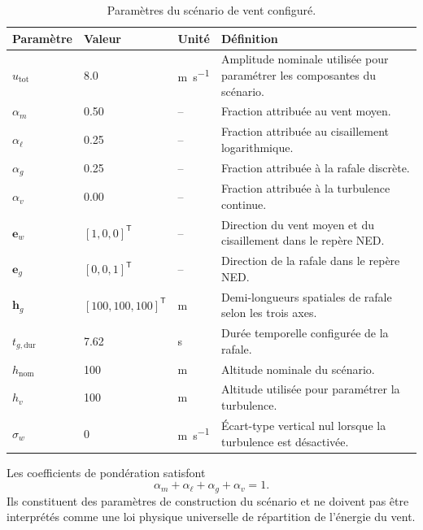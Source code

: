 \documentclass[11pt,a4paper,oneside]{report}
\newcommand{\vect}[1]{\bm{#1}}
\newcommand{\trans}{^{\mathsf T}}
\begin{document}
	\begin{table}[H]
		\centering
		\caption{Paramètres du scénario de vent configuré.}
		\label{tab_wind_scenario}
		\begin{tabularx}{\textwidth}{@{}L{4.7cm}L{3.2cm}L{2.3cm}Y@{}}
			\toprule
			\textbf{Paramètre} &
			\textbf{Valeur} &
			\textbf{Unité} &
			\textbf{Définition}\\
			\midrule
			$u_{\mathrm{tot}}$ &
			\num{8.0} &
			\si{m.s^{-1}} &
			Amplitude nominale utilisée pour paramétrer les composantes du scénario.\\
			$\alpha_m$ &
			\num{0.50} &
			-- &
			Fraction attribuée au vent moyen.\\
			$\alpha_{\ell}$ &
			\num{0.25} &
			-- &
			Fraction attribuée au cisaillement logarithmique.\\
			$\alpha_g$ &
			\num{0.25} &
			-- &
			Fraction attribuée à la rafale discrète.\\
			$\alpha_v$ &
			\num{0.00} &
			-- &
			Fraction attribuée à la turbulence continue.\\
			$\vect e_w$ &
			$[1,0,0]\trans$ &
			-- &
			Direction du vent moyen et du cisaillement dans le repère NED.\\
			$\vect e_g$ &
			$[0,0,1]\trans$ &
			-- &
			Direction de la rafale dans le repère NED.\\
			$\vect h_g$ &
			$[100,100,100]\trans$ &
			\si{m} &
			Demi-longueurs spatiales de rafale selon les trois axes.\\
			$t_{g,\mathrm{dur}}$ &
			\num{7.62} &
			\si{s} &
			Durée temporelle configurée de la rafale.\\
			$h_{\mathrm{nom}}$ &
			\num{100} &
			\si{m} &
			Altitude nominale du scénario.\\
			$h_v$ &
			\num{100} &
			\si{m} &
			Altitude utilisée pour paramétrer la turbulence.\\
			$\sigma_w$ &
			\num{0} &
			\si{m.s^{-1}} &
			Écart-type vertical nul lorsque la turbulence est désactivée.\\
			\bottomrule
		\end{tabularx}
	\end{table}
	
	Les coefficients de pondération satisfont
	\begin{equation}
		\alpha_m+\alpha_{\ell}+\alpha_g+\alpha_v=1.
		\label{eq_wind_component_fraction_sum}
	\end{equation}
	Ils constituent des paramètres de construction du scénario et ne doivent pas être interprétés comme une loi physique universelle de répartition de l'énergie du vent.
	
\end{document}

